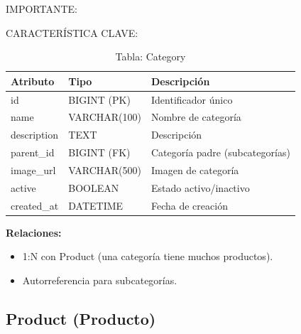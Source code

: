 \documentclass[12pt,a4paper,oneside]{book}
\begin{document}
\begin{alert}{IMPORTANTE:}
\begin{info}{CARACTERÍSTICA CLAVE:}
\begin{table}[ht]
    \centering
    \caption{Tabla: Category}
    \begin{tabular}{@{}lll@{}}
        \toprule
        \textbf{Atributo} & \textbf{Tipo} & \textbf{Descripción} \\
        \midrule
        id & BIGINT (PK) & Identificador único \\
        name & VARCHAR(100) & Nombre de categoría \\
        description & TEXT & Descripción \\
        parent\_id & BIGINT (FK) & Categoría padre (subcategorías) \\
        image\_url & VARCHAR(500) & Imagen de categoría \\
        active & BOOLEAN & Estado activo/inactivo \\
        created\_at & DATETIME & Fecha de creación \\
        \bottomrule
    \end{tabular}
\end{table}

\textbf{Relaciones:}
\begin{itemize}
    \item 1:N con Product (una categoría tiene muchos productos).
    \item Autorreferencia para subcategorías.
\end{itemize}

\subsection{Product (Producto)}
\label{sec:product}


\end{info}
\end{alert}
\end{document}
